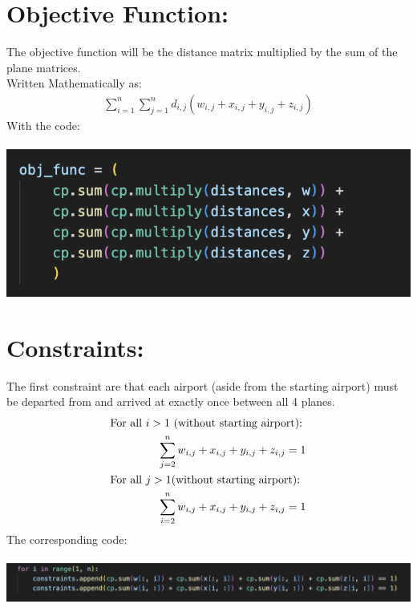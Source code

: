\documentclass[12pt]{extarticle}
\begin{document}
\section*{\small Objective Function:}
The objective function will be the distance matrix multiplied by the sum of the plane matrices. \\
Written Mathematically as:
\begin{align*}
\sum_{i=1}^n\sum_{j=1}^nd_{i,j}(w_{i,j} + x_{i,j} + y_{i,j} + z_{i,j})
\end{align*}
With the code: \\ \\
\includegraphics{images/ObjFunc.png}
\section*{\small Constraints:}
The first constraint are that each airport (aside from the starting airport) must be departed from and arrived at exactly once between all 4 planes.
\begin{align*}
&\text{For all } i > 1 \text{ (without starting airport):} \\
&\hspace{1.5cm}\sum_{j=2}^n w_{i,j} + x_{i,j} + y_{i,j} + z_{i,j} = 1 \\
&\text{For all } j > 1 \text{(without starting airport):} \\
&\hspace{1.5cm}\sum_{i=2}^n w_{i,j} + x_{i,j} + y_{i,j} + z_{i,j} = 1 \\
\end{align*}
The corresponding code: \\ \\
\includegraphics{images/constraints1.png} \\
\end{document}
